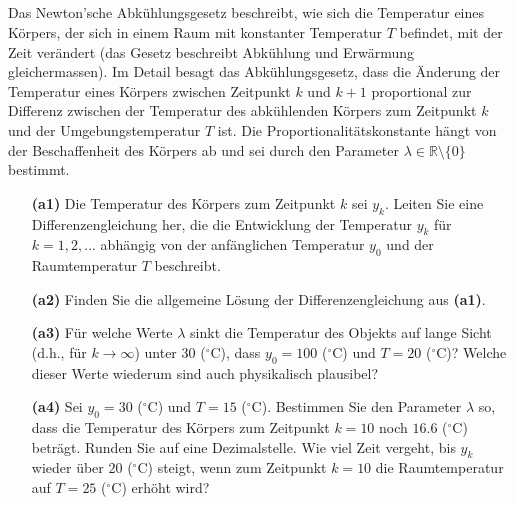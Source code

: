 \subsection*{}
Das Newton'sche Abkühlungsgesetz beschreibt, wie sich die Temperatur eines Körpers, der sich in einem Raum mit konstanter Temperatur $ T $ befindet, mit der Zeit verändert (das Gesetz beschreibt Abkühlung und Erwärmung gleichermassen).
Im Detail besagt das Abkühlungsgesetz, dass die Änderung der Temperatur eines Körpers zwischen Zeitpunkt $ k $ und $ k+1 $ proportional zur Differenz zwischen der Temperatur des abkühlenden Körpers zum Zeitpunkt $ k $ und der Umgebungstemperatur $ T $ ist. Die Proportionalitätskonstante hängt von der Beschaffenheit des Körpers ab und sei durch den Parameter $ \lambda \in \mathbb{R} \setminus \{0\} $ bestimmt.
\begin{enumerate}
	\item[\textbf{(a1)}]
	Die Temperatur des Körpers zum Zeitpunkt $ k $ sei $ y_k $.
	Leiten Sie eine Differenzengleichung her, die die Entwicklung der Temperatur $ y_k $ für $ k = 1,2,... $ abhängig von der anfänglichen Temperatur $ y_0 $ und der Raumtemperatur $ T  $ beschreibt.
	\item[\textbf{(a2)}] 
	Finden Sie die allgemeine Lösung der Differenzengleichung aus \textbf{(a1)}.
	\item[\textbf{(a3)}] 
	Für welche Werte $ \lambda $ sinkt die Temperatur des Objekts auf lange Sicht (d.h., für $ k \to \infty $) unter 30 ($ ^\circ $C), dass $ y_0 = 100 $ ($ ^\circ $C) und $ T= 20 $ ($ ^\circ $C)?
	Welche dieser Werte wiederum sind auch physikalisch plausibel?
	\item[\textbf{(a4)}]
	Sei $ y_0 = 30  $ ($ ^\circ  $C) und $ T = 15 $ ($ ^\circ  $C).
	Bestimmen Sie den Parameter $ \lambda $ so, dass die Temperatur
	des Körpers zum Zeitpunkt $ k= 10 $ noch $ 16.6 $ ($ ^\circ  $C) beträgt.
	Runden Sie auf eine Dezimalstelle. Wie viel Zeit vergeht, bis $ y_k $ wieder über $ 20 $ ($ ^\circ  $C) steigt, wenn zum Zeitpunkt $ k = 10 $ die Raumtemperatur auf $ T = 25 $ ($ ^\circ  $C) erhöht wird?
\end{enumerate}
\ \\
